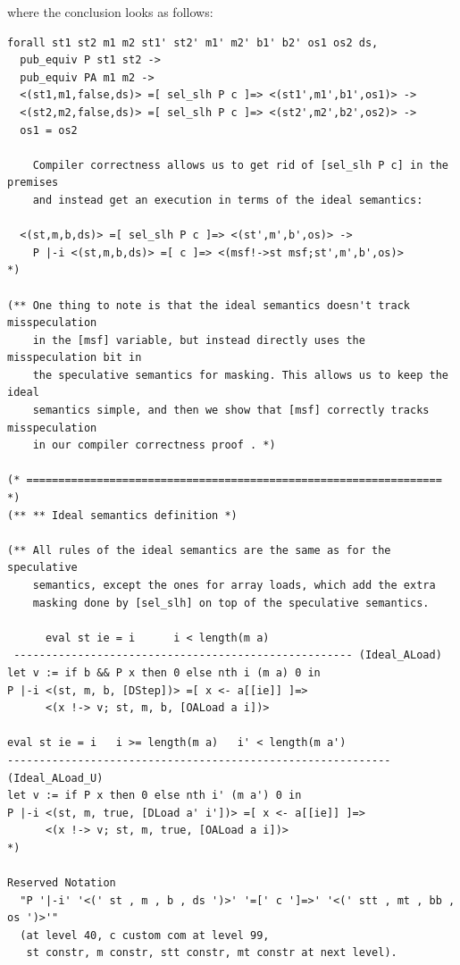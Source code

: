 \documentclass[12pt]{report}
\begin{document}
    where the conclusion looks as follows:
\begin{verbatim}
forall st1 st2 m1 m2 st1' st2' m1' m2' b1' b2' os1 os2 ds,
  pub_equiv P st1 st2 ->
  pub_equiv PA m1 m2 ->
  <(st1,m1,false,ds)> =[ sel_slh P c ]=> <(st1',m1',b1',os1)> ->
  <(st2,m2,false,ds)> =[ sel_slh P c ]=> <(st2',m2',b2',os2)> ->
  os1 = os2

    Compiler correctness allows us to get rid of [sel_slh P c] in the premises
    and instead get an execution in terms of the ideal semantics:

  <(st,m,b,ds)> =[ sel_slh P c ]=> <(st',m',b',os)> ->
    P |-i <(st,m,b,ds)> =[ c ]=> <(msf!->st msf;st',m',b',os)>
*)

(** One thing to note is that the ideal semantics doesn't track misspeculation
    in the [msf] variable, but instead directly uses the misspeculation bit in
    the speculative semantics for masking. This allows us to keep the ideal
    semantics simple, and then we show that [msf] correctly tracks misspeculation
    in our compiler correctness proof . *)

(* ================================================================= *)
(** ** Ideal semantics definition *)

(** All rules of the ideal semantics are the same as for the speculative
    semantics, except the ones for array loads, which add the extra
    masking done by [sel_slh] on top of the speculative semantics.

      eval st ie = i      i < length(m a)
 ----------------------------------------------------- (Ideal_ALoad)
let v := if b && P x then 0 else nth i (m a) 0 in
P |-i <(st, m, b, [DStep])> =[ x <- a[[ie]] ]=>
      <(x !-> v; st, m, b, [OALoad a i])>

eval st ie = i   i >= length(m a)   i' < length(m a')
------------------------------------------------------------ (Ideal_ALoad_U)
let v := if P x then 0 else nth i' (m a') 0 in
P |-i <(st, m, true, [DLoad a' i'])> =[ x <- a[[ie]] ]=>
      <(x !-> v; st, m, true, [OALoad a i])>
*)

Reserved Notation
  "P '|-i' '<(' st , m , b , ds ')>' '=[' c ']=>' '<(' stt , mt , bb , os ')>'"
  (at level 40, c custom com at level 99,
   st constr, m constr, stt constr, mt constr at next level).


\end{verbatim}
\end{document}
